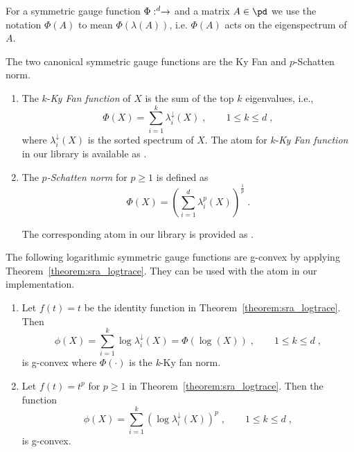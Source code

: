 \documentclass[twoside,11pt]{article}
\begin{document}
\begin{remark}
    For a symmetric gauge function $\Phi: \real^d \to \real$ and a matrix $A \in \pd$ we use the notation $\Phi(A)$ to mean $\Phi(\lambda(A))$, i.e. $\Phi(A)$ acts on the eigenspectrum of $A$.
\end{remark}

\begin{example}
    The two canonical symmetric gauge functions are the Ky Fan and $p$-Schatten norm.
    \begin{enumerate}
        \item The $k$-\emph{Ky Fan function} of $X$ is the sum of the top $k$ eigenvalues, i.e., 
        \[
        \Phi(X) = \sum_{i=1}^k \lambda_i^\downarrow(X) \; , \qquad 1 \leq k \leq d \; ,
        \]
        where $\lambda_i^\downarrow(X)$ is the sorted spectrum of $X$. The atom for $k$-\emph{Ky Fan function} in our library is available as . 
        \item The \emph{$p$-Schatten norm} for $p \geq 1$ is defined as 
        \[
        \Phi(X) = \left(\sum_{i=1}^d \lambda^p_i(X)\right)^{\frac{1}{p}} \; .
        \]

        The corresponding atom in our library is provided as .
    \end{enumerate}
\end{example}



\begin{example}
    The following logarithmic symmetric gauge functions are g-convex by applying Theorem~\ref{theorem:sra_logtrace}. They can be used with the  atom in our implementation.
    \begin{enumerate}
        \item Let $f(t) = t$ be the identity function in Theorem~\ref{theorem:sra_logtrace}. Then 
        \[
        \phi(X) = \sum_{i=1}^k \log \lambda_i^\downarrow(X) = \Phi(\log(X)) \; , \qquad 1 \leq k \leq d \; ,
        \]
    is g-convex where $\Phi(\cdot)$ is the \textit{k}-Ky fan norm. 
    \item Let $f(t) = t^p$ for $p \geq 1$ in Theorem~\ref{theorem:sra_logtrace}. Then the function
    \[
    \phi(X) = \sum_{i=1}^k \left(\log \lambda^\downarrow_i(X)\right)^p \; , \qquad 1 \leq k \leq d \; ,
    \]
    is g-convex. 
    \end{enumerate}

\end{example}
\end{document}
